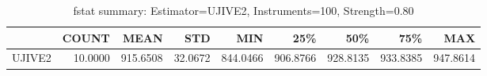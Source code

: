 \begin{table}[ht]
\centering
\caption{fstat summary: Estimator=UJIVE2, Instruments=100, Strength=0.80}
\begin{tabular}{lrrrrrrrr}
\toprule
 & COUNT & MEAN & STD & MIN & 25\% & 50\% & 75\% & MAX \\
\midrule
UJIVE2 & 10.0000 & 915.6508 & 32.0672 & 844.0466 & 906.8766 & 928.8135 & 933.8385 & 947.8614 \\
\bottomrule
\end{tabular}
\end{table}
